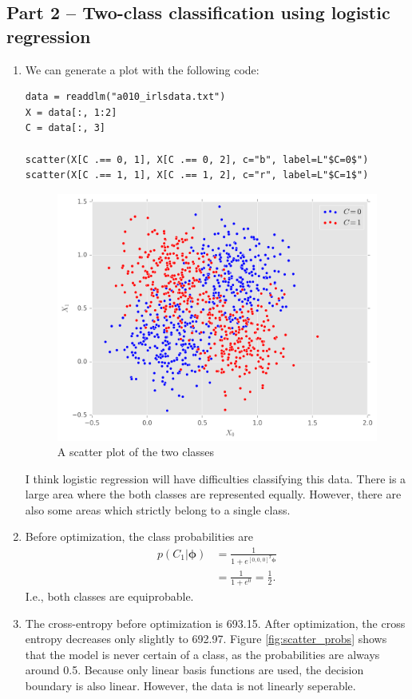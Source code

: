\documentclass{article}
\begin{document}
\subsection*{Part 2 -- Two-class classification using logistic regression}
\begin{enumerate}
\item We can generate a plot with the following code:
\begin{lstlisting}
data = readdlm("a010_irlsdata.txt")
X = data[:, 1:2]
C = data[:, 3]

scatter(X[C .== 0, 1], X[C .== 0, 2], c="b", label=L"$C=0$")
scatter(X[C .== 1, 1], X[C .== 1, 2], c="r", label=L"$C=1$")
\end{lstlisting}
\begin{figure}[H]
\centering
\includegraphics[width=.6\linewidth]{images/scatter.png}
\caption{A scatter plot of the two classes}
\label{fig:scatter}
\end{figure}
I think logistic regression will have difficulties classifying this data. There is a large area where the both classes are represented equally. However, there are also some areas which strictly belong to a single class.
\item Before optimization, the class probabilities are
\begin{align*}
p(C_1|\bm{\phi}) &= \frac{1}{1+e^{[0, 0, 0]^T\bm{\phi}}} \\
&= \frac{1}{1+e^0} = \frac{1}{2}.
\end{align*}
I.e., both classes are equiprobable.
\item 
The cross-entropy before optimization is 693.15. After optimization, the cross entropy decreases only slightly to 692.97. Figure \ref{fig:scatter_probs} shows that the model is never certain of a class, as the probabilities are always around 0.5. Because only linear basis functions are used, the decision boundary is also linear. However, the data is not linearly seperable.

\end{enumerate}
\end{document}
